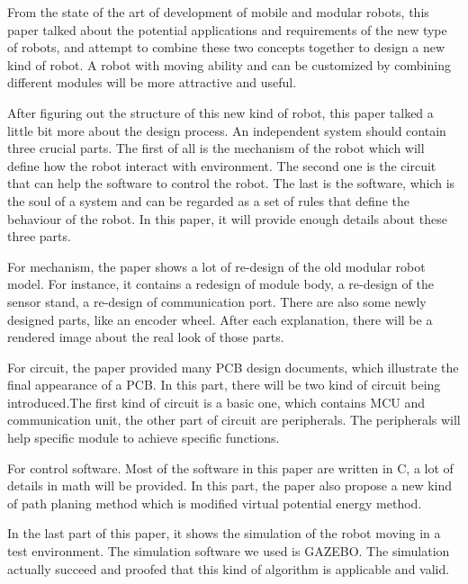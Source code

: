 \begin{englishabstract}
From the state of the art of development of mobile and modular robots, this paper talked about the potential applications and requirements of the new type of robots, and attempt to combine these two concepts together to design a new kind of robot. A robot with moving ability and can be customized by combining different modules will be more attractive and useful.

After figuring out the structure of this new kind of robot, this paper talked a little bit more about the design process. An independent system should contain three crucial parts. The first of all is the mechanism of the robot which will define how the robot interact with environment. The second one is the circuit that can help the software to control the robot. The last is the software, which is the soul of a system and can be regarded as a set of rules that define the behaviour of the robot. In this paper, it will provide enough details about these three parts.

For mechanism, the paper shows a lot of re-design of the old modular robot model. For instance, it contains a redesign of module body, a re-design of the sensor stand, a re-design of communication port. There are also some newly designed parts, like an encoder wheel. After each explanation, there will be a rendered image about the real look of those parts.

For circuit, the paper provided many PCB design documents, which illustrate the final appearance of a PCB. In this part, there will be two kind of circuit being introduced.The first kind of circuit is a basic one, which contains MCU and communication unit, the other part of circuit are peripherals. The peripherals will help specific module to achieve specific functions.

For control software. Most of the software in this paper are written in C, a lot of details in math will be provided. In this part, the paper also propose a new kind of path planing method which is modified virtual potential energy method. 

In the last part of this paper, it shows the simulation of the robot moving in a test environment. The simulation software we used is GAZEBO. The simulation actually succeed and proofed that this kind of algorithm is applicable and valid.


\end{englishabstract}
